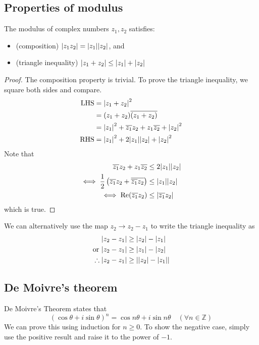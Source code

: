 \subsection{Properties of modulus}
The modulus of complex numbers \(z_1, z_2\) satisfies:
\begin{itemize}
	\item (composition) \(\abs{z_1 z_2} = \abs{z_1} \abs{z_2}\), and
	\item (triangle inequality) \(\abs{z_1 + z_2} \leq \abs{z_1} + \abs{z_2}\)
\end{itemize}
\begin{proof}
	The composition property is trivial.
	To prove the triangle inequality, we square both sides and compare.
	\begin{align*}
		\text{LHS} & = \abs{z_1 + z_2}^2                                                 \\
		           & = (z_1 + z_2)\overline{(z_1 + z_2)}                                 \\
		           & = \abs{z_1}^2 + \overline{z_1}z_2 + z_1\overline{z_2} + \abs{z_2}^2 \\
		\text{RHS} & = \abs{z_1}^2 + 2 \abs{z_1}\abs{z_2} + \abs{z_2}^2
	\end{align*}
	Note that
	\begin{align*}
		\overline{z_1}z_2 + z_1\overline{z_2}                                           & \leq 2 \abs{z_1}\abs{z_2}     \\
		\iff \frac{1}{2}\left( \overline{z_1}z_2 + \overline{\overline{z_1}z_2} \right) & \leq \abs{z_1}\abs{z_2}       \\
		\iff \Re (\overline{z_1} z_2)                                                   & \leq \abs{\overline{z_1} z_2}
	\end{align*}
	which is true.
\end{proof}

We can alternatively use the map \(z_2 \to z_2 - z_1\) to write the triangle inequality as
\begin{align*}
	\abs{z_2 - z_1}            & \geq \abs{z_2} - \abs{z_1}       \\
	\text{or } \abs{z_2 - z_1} & \geq \abs{z_1} - \abs{z_2}       \\
	\therefore \abs{z_2 - z_1} & \geq \abs{\abs{z_2} - \abs{z_1}} \\
\end{align*}

\subsection{De Moivre's theorem}
De Moivre's Theorem states that
\[
	(\cos \theta + i \sin \theta)^n = \cos n \theta + i \sin n \theta \quad(\forall n \in \mathbb Z)
\]
We can prove this using induction for \(n \geq 0\).
To show the negative case, simply use the positive result and raise it to the power of \(-1\).

